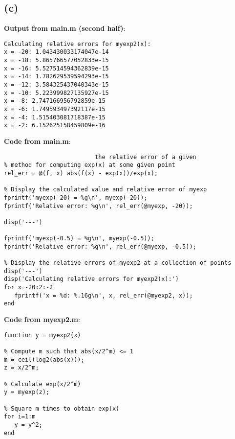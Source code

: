 \documentclass{article}
\begin{document}
\subsection*{(c)}

\textbf{Output from main.m (second half)}:
\begin{Verbatim}[frame=single]
Calculating relative errors for myexp2(x):
x = -20: 1.043430033174047e-14
x = -18: 5.865766577052833e-15
x = -16: 5.527514594362839e-15
x = -14: 1.782629539594293e-15
x = -12: 3.584325437040343e-15
x = -10: 5.223999827135927e-15
x = -8: 2.747166956792859e-15
x = -6: 1.749593497392117e-15
x = -4: 1.515403081718387e-15
x = -2: 6.152625158459809e-16
\end{Verbatim}
\textbf{Code from main.m}:
\begin{Verbatim}[frame=single]
% Symbolic function, which calculates
	                      the relative error of a given
% method for computing exp(x) at some given point
rel_err = @(f, x) abs(f(x) - exp(x))/exp(x);

% Display the calculated value and relative error of myexp
fprintf('myexp(-20) = %g\n', myexp(-20));
fprintf('Relative error: %g\n', rel_err(@myexp, -20));

disp('---')

fprintf('myexp(-0.5) = %g\n', myexp(-0.5));
fprintf('Relative error: %g\n', rel_err(@myexp, -0.5));

% Display the relative errors of myexp2 at a collection of points
disp('---')
disp('Calculating relative errors for myexp2(x):')
for x=-20:2:-2
   fprintf('x = %d: %.16g\n', x, rel_err(@myexp2, x));
end
\end{Verbatim}
\textbf{Code from myexp2.m}:
\begin{Verbatim}[frame=single]
function y = myexp2(x)

% Compute m such that abs(x/2^m) <= 1
m = ceil(log2(abs(x)));
z = x/2^m;

% Calculate exp(x/2^m)
y = myexp(z);

% Square m times to obtain exp(x)
for i=1:m
   y = y^2;
end
\end{Verbatim}
\end{document}
